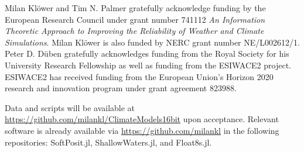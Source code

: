 \documentclass[draft]{agujournal2019}
\begin{document}
\acknowledgments
Milan Kl\"{o}wer and Tim N. Palmer gratefully acknowledge funding by the European
Research Council under grant number 741112 \emph{An Information Theoretic Approach
to Improving the Reliability of Weather and Climate Simulations}. Milan Kl\"{o}wer
is also funded by NERC grant number NE/L002612/1.  Peter D. D\"{u}ben gratefully
acknowledges funding from the Royal Society for his University Research Fellowship
as well as funding from the ESIWACE2 project. ESIWACE2 has received funding from
the European Union's Horizon 2020 research and innovation program under grant
agreement 823988.

Data and scripts will be available at
\url{https://github.com/milankl/ClimateModels16bit} upon acceptance. Relevant
software is already available via \url{https://github.com/milankl} in the following
repositories: SoftPosit.jl, ShallowWaters.jl, and Float8s.jl.


\end{document}
